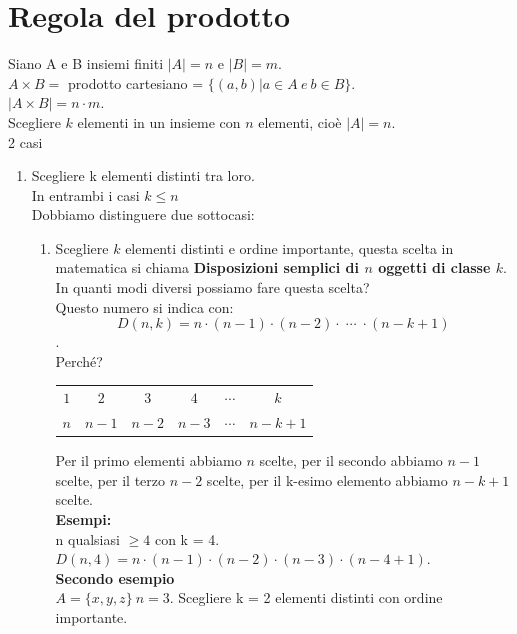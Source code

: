 \documentclass[12pt, letterpaper]{report}
\begin{document}
  		\section{Regola del prodotto}
  		Siano A e B insiemi finiti $|A| = n$ e $|B| = m$. \\
  		$A \times B =$ prodotto cartesiano = $\{(a, b) | a \in A \ e \ b \in B\}$.
  		\\
  		$|A \times B| = n \cdot m$.
  		\\
  		Scegliere $k$ elementi in un insieme con $n$ elementi, cioè $|A| = n$. \\
  		2 casi
  		\begin{enumerate}
  			\item Scegliere k elementi distinti tra loro. \\
  			In entrambi i casi $k \leq n$ \\
  			Dobbiamo distinguere due sottocasi:
  			\begin{enumerate}
  				\item Scegliere $k$ elementi distinti e ordine importante, questa scelta in matematica si chiama \textbf{Disposizioni semplici di $n$ oggetti di classe $k$}. \\
  				In quanti modi diversi possiamo fare questa scelta? \\
  				Questo numero si indica con: \[D(n, k) = n \cdot (n - 1) \cdot (n - 2) \cdot \; \cdots \; \cdot (n - k + 1)\].
  				\\
  				Perché? \\
  				\begin{center}
  					\begin{tabular}{c c c c c c}
  						$1$ & $2$ & $3$ & $4$ & $\cdots$ & $k$ \\
  						$n$ & $n-1$ & $n-2$ & $n-3$ & $\cdots$ & $n-k+1$
  					\end{tabular}
  				\end{center}
  				Per il primo elementi abbiamo $n$ scelte, per il secondo abbiamo $n - 1$ scelte, per il terzo $n - 2$ scelte, per il k-esimo elemento abbiamo $n - k + 1$ scelte. \\
  				\textbf{Esempi: } \\
  				n qualsiasi $\geq 4$ con k = 4.
  				\\
  				$D(n, 4) = n \cdot (n - 1) \cdot (n- 2) \cdot (n - 3) \cdot (n - 4 + 1)$. \\
  				\textbf{Secondo esempio} \\
  				$A = \{x, y, z\} \ n = 3$. Scegliere k = 2 elementi distinti con ordine importante. \\

\end{enumerate}
\end{enumerate}
\end{document}
